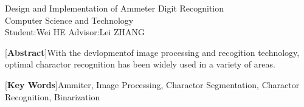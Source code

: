 \begin{center}
Design and Implementation of Ammeter Digit Recognition\\[1ex]
Computer Science and Technology\\[1ex]
Student:\quad Wei HE \quad Advisor:\quad Lei ZHANG\\[2ex]
\end{center}\par

{[\textbf{Abstract}]With the devlopmentof image processing and recogition technology, optimal charactor recognition has been widely used in a variety of areas. }

[\textbf{Key Words}]Ammiter, Image Processing, Charactor Segmentation, Charactor Recognition, Binarization